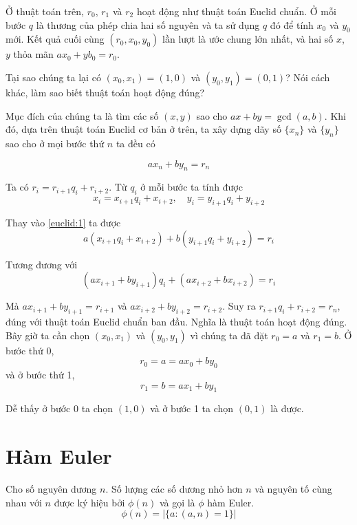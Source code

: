 \documentclass{mynotes}
\begin{document}
Ở thuật toán trên, $r_0$, $r_1$ và $r_2$ hoạt động như thuật toán Euclid chuẩn. Ở mỗi bước $q$ là thương của phép chia hai số nguyên và ta sử dụng $q$ đó để tính $x_0$ và $y_0$ mới. Kết quả cuối cùng $(r_0, x_0, y_0)$ lần lượt là ước chung lớn nhất, và hai số $x$, $y$ thỏa mãn $a x_0 + y b_0 = r_0$.

Tại sao chúng ta lại có $(x_0, x_1) = (1, 0)$ và $(y_0, y_1) = (0, 1)$? Nói cách khác, làm sao biết thuật toán  hoạt động đúng?

Mục đích của chúng ta là tìm các số $(x, y)$ sao cho $ax + by = \gcd(a, b)$. Khi đó, dựa trên thuật toán Euclid cơ bản ở trên, ta xây dựng dãy số $\{x_n\}$ và $\{y_n\}$ sao cho ở mọi bước thứ $n$ ta đều có

\begin{equation}\label{euclid:1}
    a x_n + b y_n = r_n
\end{equation}

Ta có $r_i = r_{i+1} q_i + r_{i+2}$. Từ $q_i$ ở mỗi bước ta tính được
\begin{equation*}
    x_i = x_{i+1} q_i + x_{i+2}, \quad y_i = y_{i+1} q_i + y_{i+2}
\end{equation*}

Thay vào \ref{euclid:1} ta được
\begin{equation}
    a (x_{i+1} q_i + x_{i+2}) + b (y_{i+1} q_i + y_{i+2}) = r_i
\end{equation}

Tương đương với \[(a x_{i+1} + b y_{i+1}) q_i + (a x_{i+2} + b x_{i+2}) = r_i\]

Mà $a x_{i+1} + b y_{i+1} = r_{i+1}$ và $a x_{i+2} + b y_{i+2} = r_{i+2}$. Suy ra $r_{i+1} q_i + r_{i+2} = r_n$, đúng với thuật toán Euclid chuẩn ban đầu. Nghĩa là thuật toán hoạt động đúng. Bây giờ ta cần chọn $(x_0, x_1)$ và $(y_0, y_1)$ vì chúng ta đã đặt $r_0 = a$ và $r_1 = b$. Ở bước thứ 0, \[r_0 = a = a x_0 + b y_0\] và ở bước thứ 1,
\[r_1 = b = a x_1 + b y_1\]

Dễ thấy ở bước 0 ta chọn $(1, 0)$ và ở bước 1 ta chọn $(0, 1)$ là được.

\section{Hàm Euler}

\begin{definition}
    Cho số nguyên dương $n$. Số lượng các số dương nhỏ hơn $n$ và nguyên tố cùng nhau với $n$ được ký hiệu bởi $\phi(n)$ và gọi là $\phi$ hàm Euler. \[ \phi(n) = \lvert \{ a : (a, n) = 1\} \rvert \]
\end{definition}   
\end{document}
